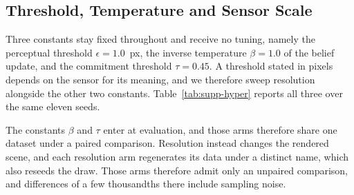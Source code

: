 \documentclass{article} %
\theoremstyle{defstyle}
\theoremstyle{plain}
\begin{document}
\subsection{Threshold, Temperature and Sensor Scale}
\label{sec:supp-hyper}

Three constants stay fixed throughout and receive no tuning, namely the perceptual
threshold $\epsilon = 1.0$~px, the inverse temperature $\beta = 1.0$ of the belief update,
and the commitment threshold $\tau = 0.45$. A threshold stated in pixels depends on the
sensor for its meaning, and we therefore sweep resolution alongside the other two constants.
Table~\ref{tab:supp-hyper} reports all three over the same eleven seeds.

The constants $\beta$ and $\tau$ enter at evaluation, and those arms therefore share one
dataset under a paired comparison. Resolution instead changes the rendered scene, and each
resolution arm regenerates its data under a distinct name, which also reseeds the draw.
Those arms therefore admit only an unpaired comparison, and differences of a few thousandths
there include sampling noise.
\end{document}
